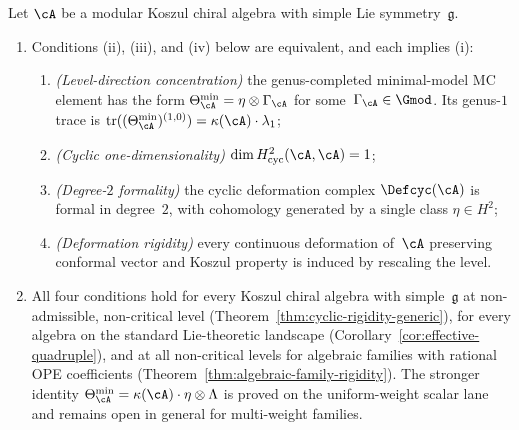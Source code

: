 \begin{proposition}
\label{prop:saturation-equivalence}
Let\/ $\cA$ be a modular Koszul chiral algebra with
simple Lie symmetry~$\mathfrak{g}$.
\begin{enumerate}[label=\textup{(\alph*)}]
\item Conditions
  \textup{(ii)},
  \textup{(iii)}, and
  \textup{(iv)} below are equivalent, and each implies
  \textup{(i)}:
\begin{enumerate}[label=\textup{(\roman*)}]
\item \emph{\textup{(}Level-direction concentration\textup{)}}
  the genus-completed minimal-model MC element has the form
  $\Theta_{\cA}^{\min} = \eta\otimes\Gamma_{\cA}$
  for some\/~$\Gamma_{\cA} \in \Gmod$.
  Its genus-$1$ trace is
  $\operatorname{tr}((\Theta_{\cA}^{\min})^{(1,0)})
   = \kappa(\cA)\cdot\lambda_1$;
\item \emph{\textup{(}Cyclic one-dimensionality\textup{)}}
  $\dim H^2_{\mathrm{cyc}}(\cA, \cA) = 1$;
\item \emph{\textup{(}Degree-$2$ formality\textup{)}}
  the cyclic deformation complex $\Defcyc(\cA)$ is
  formal in degree~$2$, with cohomology generated by a
  single class $\eta \in H^2$;
\item \emph{\textup{(}Deformation rigidity\textup{)}}
  every continuous deformation of\/~$\cA$ preserving
  conformal vector and Koszul property is induced by
  rescaling the level.
\end{enumerate}
\item All four conditions hold for every
  Koszul chiral algebra with simple~$\mathfrak{g}$
  at non-admissible, non-critical level
  \textup{(}Theorem~\textup{\ref{thm:cyclic-rigidity-generic}}\textup{)},
  for every algebra on the standard Lie-theoretic landscape
  \textup{(}Corollary~\textup{\ref{cor:effective-quadruple}}\textup{)},
  and at all non-critical levels for algebraic families
  with rational OPE coefficients
  \textup{(}Theorem~\textup{\ref{thm:algebraic-family-rigidity}}\textup{)}.
  The stronger identity
  $\Theta_{\cA}^{\min} = \kappa(\cA)\cdot\eta\otimes\Lambda$
  is proved on the uniform-weight scalar lane and remains open in
  general for multi-weight families.
\end{enumerate}
\end{proposition}

